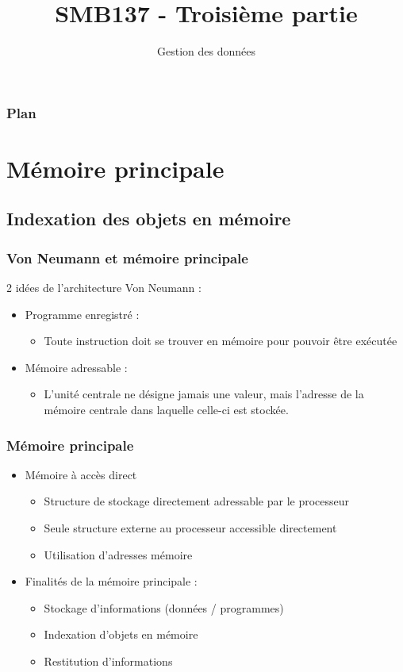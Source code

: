 

\title{SMB137 - Troisième partie}
\subtitle{Gestion des données}


\frame[plain]{\titlepage}


\begin{frame}
 \frametitle{Plan}
 \tableofcontents
\end{frame}

\section{Mémoire principale}

\subsection{Indexation des objets en mémoire}

\begin{frame}
 \frametitle{Von Neumann et mémoire principale}
2 idées de l’architecture Von Neumann :
\begin{itemize}
	\item Programme enregistré :
	\begin{itemize}
	\item Toute instruction doit se trouver en mémoire pour pouvoir être exécutée
	\end{itemize}
	\item Mémoire adressable :
	\begin{itemize}
	\item L’unité centrale ne désigne jamais une valeur, mais l’adresse de la mémoire centrale dans laquelle celle-ci est stockée.
	\end{itemize}
\end{itemize}
 \end{frame}

\begin{frame}
\frametitle{Mémoire principale}
\begin{itemize}
\item <1> Mémoire à accès direct
\begin{itemize}
\item Structure de stockage directement adressable par le processeur
\item Seule structure externe au processeur accessible directement
\item Utilisation d'adresses mémoire
\end{itemize}

\item <2> Finalités de la mémoire principale :
\begin{itemize}
	\item Stockage d'informations (données / programmes)
	\item Indexation d'objets en mémoire
	\item Restitution d'informations
\end{itemize}

\end{itemize}
\end{frame}


